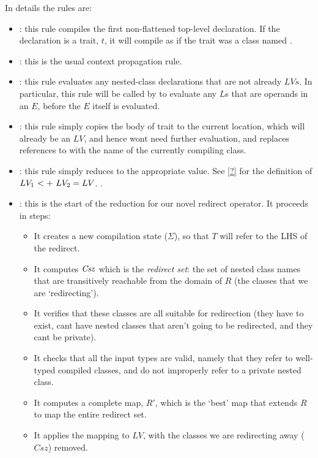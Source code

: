 \noindent In details the rules are:
\begin{itemize}
	\item {}: this rule compiles the first non-flattened top-level declaration. If the declaration is a trait, $t$, it will compile as if the trait was a class named \This.
	\item {}: this is the usual context propagation rule.
	\item {}: this rule evaluates any nested-class declarations that are not already $LVs$. In particular, this rule will be called by  to evaluate any $L$s that are operands in an $E$, before the $E$ itself is evaluated.
	\item {}: this rule simply copies the body of trait to the current location, which will already be an $LV$, and hence wont need further evaluation, and replaces references to \This with the name of the currently compiling class.
	\item {}: this rule simply reduces to the appropriate value. See \autoref{?} for the definition of $\summ{LV_1}{LV_2}=LV$. .
	\item {}: this is the start of the reduction for our novel redirect operator. It proceeds in steps:
	\begin{itemize}
		\item It creates a new compilation state ($\Sigma$), so that $T$ will refer to the LHS of the redirect.
		\item It computes $\mathit{Csz}$ which is the \emph{redirect set}: the set of nested class names that are transitively reachable from the domain of $R$ (the classes that we are `redirecting').
		\item It verifies that these classes are all suitable for redirection (they have to exist, cant have nested classes that aren't going to be redirected, and they cant be private).
		\item It checks that all the input types are valid, namely that they refer to well-typed compiled classes, and do not improperly refer to a private nested class.
		\item It computes a complete map, $R'$, which is the `best' map that extends  $R$ to map the entire redirect set.
		\item It applies the mapping to $LV$, with the classes we are redirecting away ($Csz$) removed.
	\end{itemize}
\end{itemize}


